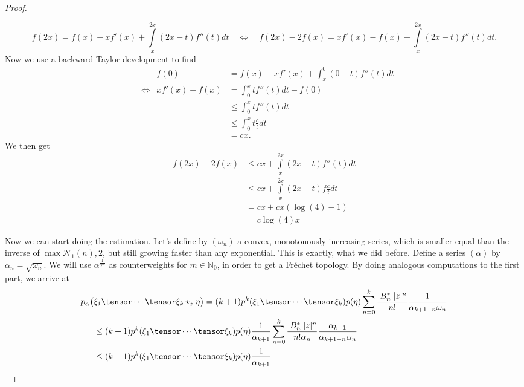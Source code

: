 \documentclass[
11pt,                          %
english                        %
]{article}
\begin{document}
\begin{proof}
\begin{subproof}
		\begin{equation*}
			f(2x)
			=
			f(x) - x f'(x) +
			\int\limits_x^{2x} (2x-t) f''(t) dt
			\quad
			\Longleftrightarrow
			\quad
			f(2x) - 2 f(x)
			=
			x f'(x) - f(x) +
			\int\limits_x^{2x} (2x-t) f''(t) dt.
		\end{equation*}
		Now we use a backward Taylor development to find
		\begin{align*}
			&&
			f(0)
			&=
			f(x) - xf'(x) + \int_x^0 (0-t) f''(t) dt
			\\
			& \Longleftrightarrow &
			xf'(x) - f(x)
			&=
			\int_0^x t f''(t) dt - f(0)
			\\&&
			& \leq
			\int_0^x t f''(t) dt
			\\&&
			& \leq
			\int_0^x t \frac{c}{t} dt
			\\&&
			&=
			cx.
		\end{align*}
		We then get
		\begin{align*}
			f(2x) - 2 f(x)
			& \leq
			cx + \int\limits_x^{2x} (2x-t) f''(t) dt
			\\
			& \leq
			cx + 
			\int\limits_x^{2x} (2x-t) f\frac{c}{t} dt
			\\
			&=
			cx + cx (\log(4) - 1)
			\\
			&=
			c \log(4) x
		\end{align*}
	\end{subproof}
	Now we can start doing the estimation. Let's define by $(\omega_n)$ a convex, 
	monotonously increasing series, which is smaller equal than the inverse of 
	$\max{\mathcal{N}_1(n), 2}$, but still growing faster than any exponential. This 
	is exactly, what we did before. Define a series $(\alpha)$ by $\alpha_n = 
	\sqrt{\omega_n}$. We will use $\alpha^{\frac{1}{2^m}}$ as counterweights for $m 
	\in \mathbb{N}_0$, in order to get a Fr\'echet topology.
	By doing analogous computations to the first part, we arrive at
	\begin{align*}
		p_\alpha \big(
		&
			\xi_1 \tensor \cdots \tensor \xi_k
			\star_z
			\eta
		\big)
		=
		(k+1) 
		p^k(\xi_1 \tensor \cdots \tensor \xi_k)
		p(\eta)
		\sum\limits_{n=0}^k
		\frac{|B_n^*| |z|^n}{n!}
		\frac{1}{\alpha_{k+1-n} \omega_n}
		\\
		& \leq
		(k+1) 
		p^k(\xi_1 \tensor \cdots \tensor \xi_k)
		p(\eta)
		\frac{1}{\alpha_{k+1}}
		\sum\limits_{n=0}^k
		\frac{|B_n^*| |z|^n}{n! \alpha_n}
		\frac{\alpha_{k+1}}{\alpha_{k+1-n} \alpha_n}
		\\
		& \leq
		(k+1) 
		p^k(\xi_1 \tensor \cdots \tensor \xi_k)
		p(\eta)
		\frac{1}{\alpha_{k+1}}

\end{align*}
\end{proof}
\end{document}
